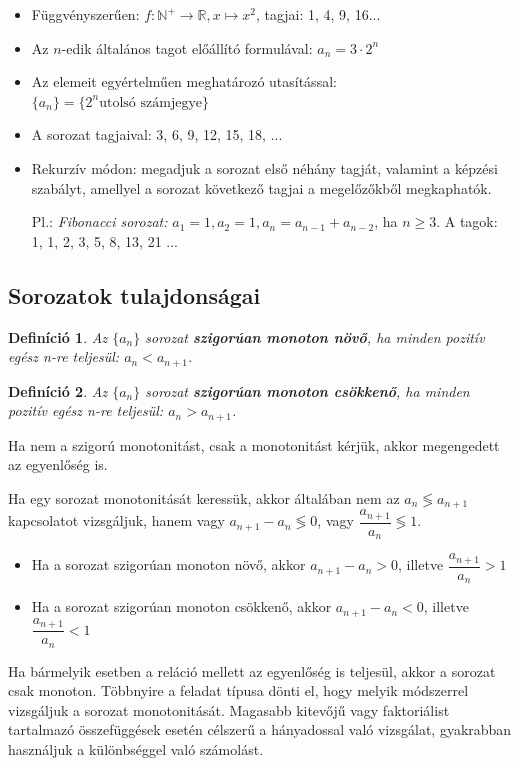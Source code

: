 \documentclass[12pt,a4paper]{article}
\newtheorem{definition}{Definíció} [section]
\begin{document}
\begin{itemize}
\item Függvényszerűen: $f: \mathbb{N}^+ \rightarrow \mathbb{R}, x \mapsto x^2$, tagjai: 1, 4, 9, 16...
\item Az $n$-edik általános tagot előállító formulával: $a_n = 3 \cdot 2^n$
\item Az elemeit egyértelműen meghatározó utasítással: $\{a_n\} = \{2^n \text{utolsó számjegye}\}$
\item A sorozat tagjaival: 3, 6, 9, 12, 15, 18, ...
\item Rekurzív módon: megadjuk a sorozat első néhány tagját, valamint a képzési szabályt, amellyel a sorozat következő tagjai a megelőzőkből megkaphatók.

Pl.: \textit{Fibonacci sorozat:} $a_1 = 1, a_2 = 1, a_n = a_{n - 1} + a_{n - 2}$, ha $n\geq 3$. A tagok: 1, 1, 2, 3, 5, 8, 13, 21 ...
\end{itemize}

\subsection{Sorozatok tulajdonságai}

\begin{definition}
Az $\{a_n\}$ sorozat \textbf{szigorúan monoton növő}, ha minden pozitív egész n-re teljesül: $a_n < a_{n + 1}$.
\end{definition}

\begin{definition}
Az $\{a_n\}$ sorozat \textbf{szigorúan monoton csökkenő}, ha minden pozitív egész n-re teljesül: $a_n > a_{n + 1}$.
\end{definition}

Ha nem a szigorú monotonitást, csak a monotonitást kérjük, akkor megengedett az egyenlőség is.

Ha egy sorozat monotonitását keressük, akkor általában nem az $a_n \lessgtr a_{n+1}$ kapcsolatot vizsgáljuk, hanem vagy $a_{n+1}-a_n \lessgtr 0$, vagy $\dfrac{a_{n+1}}{a_n}\lessgtr 1$.


\begin{itemize}
\item Ha a sorozat szigorúan monoton növő, akkor $a_{n+1}-a_n > 0$, illetve $\dfrac{a_{n+1}}{a_n} > 1$
\item Ha a sorozat szigorúan monoton csökkenő, akkor $a_{n+1}-a_n < 0$, illetve $\dfrac{a_{n+1}}{a_n} < 1$
\end{itemize}

Ha bármelyik esetben a reláció mellett az egyenlőség is teljesül, akkor a sorozat csak monoton. Többnyire a feladat típusa dönti el, hogy melyik módszerrel vizsgáljuk a sorozat monotonitását. Magasabb kitevőjű vagy faktoriálist tartalmazó összefüggések esetén célszerű a hányadossal való vizsgálat, gyakrabban használjuk a különbséggel való számolást.
\end{document}

